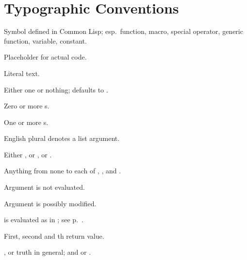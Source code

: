 %
%
\section*{Typographic Conventions}

\begin{LIST}{1cm}

  {
  Symbol defined in Common Lisp; esp.\ function, macro, special
  operator, generic function, variable, constant. 
  }

  {
  Placeholder for actual code.
  }

  {
  Literal text.
  }

  {
  Either one  or nothing; defaults to .
  }

  {
  Zero or more s.
  }

  {
  One or more s.
  }

  {
  English plural denotes a list argument.
  }

  {
  Either , or , or .
  }

  {
  Anything from none to each of , , and .
  }

  {
  Argument  is not evaluated.
  }

  {
  Argument  is possibly modified.
  }

  {
   is evaluated as in ; see p.\ \pageref{:progn}.
  }

  {
  First, second and th return value.
  }

  \IT{\T; \NIL\qquad\qquad\qquad}
  {
  , or truth in general; and  or \kwd{()}.
  }
  
\end{LIST}

